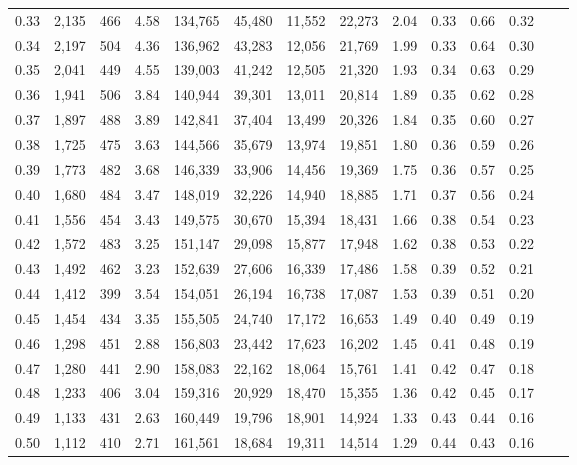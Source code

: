 \begin{tabular}{rrrrrrrrrrrrrr}
0.33 &  2,135 &  466 &    4.58 &  134,765 &   45,480 &  11,552 &  22,273 &  2.04 &  0.33 &  0.66 &      0.32 \\
0.34 &  2,197 &  504 &    4.36 &  136,962 &   43,283 &  12,056 &  21,769 &  1.99 &  0.33 &  0.64 &      0.30 \\
0.35 &  2,041 &  449 &    4.55 &  139,003 &   41,242 &  12,505 &  21,320 &  1.93 &  0.34 &  0.63 &      0.29 \\
0.36 &  1,941 &  506 &    3.84 &  140,944 &   39,301 &  13,011 &  20,814 &  1.89 &  0.35 &  0.62 &      0.28 \\
0.37 &  1,897 &  488 &    3.89 &  142,841 &   37,404 &  13,499 &  20,326 &  1.84 &  0.35 &  0.60 &      0.27 \\
0.38 &  1,725 &  475 &    3.63 &  144,566 &   35,679 &  13,974 &  19,851 &  1.80 &  0.36 &  0.59 &      0.26 \\
0.39 &  1,773 &  482 &    3.68 &  146,339 &   33,906 &  14,456 &  19,369 &  1.75 &  0.36 &  0.57 &      0.25 \\
0.40 &  1,680 &  484 &    3.47 &  148,019 &   32,226 &  14,940 &  18,885 &  1.71 &  0.37 &  0.56 &      0.24 \\
0.41 &  1,556 &  454 &    3.43 &  149,575 &   30,670 &  15,394 &  18,431 &  1.66 &  0.38 &  0.54 &      0.23 \\
0.42 &  1,572 &  483 &    3.25 &  151,147 &   29,098 &  15,877 &  17,948 &  1.62 &  0.38 &  0.53 &      0.22 \\
0.43 &  1,492 &  462 &    3.23 &  152,639 &   27,606 &  16,339 &  17,486 &  1.58 &  0.39 &  0.52 &      0.21 \\
0.44 &  1,412 &  399 &    3.54 &  154,051 &   26,194 &  16,738 &  17,087 &  1.53 &  0.39 &  0.51 &      0.20 \\
0.45 &  1,454 &  434 &    3.35 &  155,505 &   24,740 &  17,172 &  16,653 &  1.49 &  0.40 &  0.49 &      0.19 \\
0.46 &  1,298 &  451 &    2.88 &  156,803 &   23,442 &  17,623 &  16,202 &  1.45 &  0.41 &  0.48 &      0.19 \\
0.47 &  1,280 &  441 &    2.90 &  158,083 &   22,162 &  18,064 &  15,761 &  1.41 &  0.42 &  0.47 &      0.18 \\
0.48 &  1,233 &  406 &    3.04 &  159,316 &   20,929 &  18,470 &  15,355 &  1.36 &  0.42 &  0.45 &      0.17 \\
0.49 &  1,133 &  431 &    2.63 &  160,449 &   19,796 &  18,901 &  14,924 &  1.33 &  0.43 &  0.44 &      0.16 \\
0.50 &  1,112 &  410 &    2.71 &  161,561 &   18,684 &  19,311 &  14,514 &  1.29 &  0.44 &  0.43 &      0.16 \\

\end{tabular}
